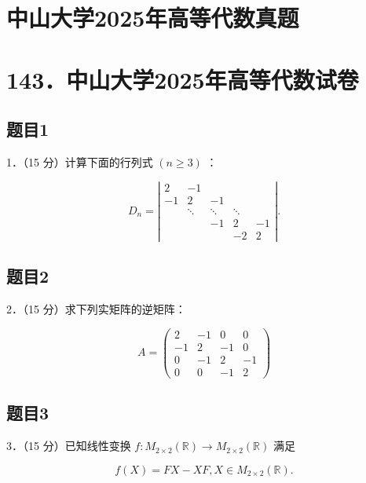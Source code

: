 \documentclass{article}
\begin{document}
\section*{中山大学2025年高等代数真题}
\section*{143．中山大学2025年高等代数试卷}

\subsection{题目1}
1．（15 分）计算下面的行列式 \((n \geq 3)\) ：

\[
D_{n}=\left|\begin{array}{ccccc}
2 & -1 & & & \\
-1 & 2 & -1 & & \\
& \ddots & \ddots & \ddots & \\
& & -1 & 2 & -1 \\
& & & -2 & 2
\end{array}\right| .
\]

\subsection{题目2}
2．（15 分）求下列实矩阵的逆矩阵：

\[
A=\left(\begin{array}{cccc}
2 & -1 & 0 & 0 \\
-1 & 2 & -1 & 0 \\
0 & -1 & 2 & -1 \\
0 & 0 & -1 & 2
\end{array}\right)
\]

\subsection{题目3}
3．（15 分）已知线性变换 \(f: M_{2 \times 2}(\mathbb{R}) \rightarrow M_{2 \times 2}(\mathbb{R})\) 满足

\[
f(X)=F X-X F, X \in M_{2 \times 2}(\mathbb{R}) .
\]
\end{document}
